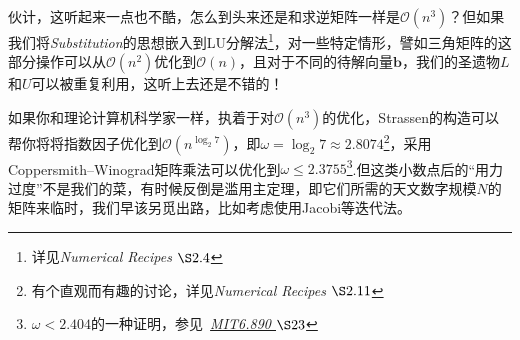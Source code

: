 伙计，这听起来一点也不酷，怎么到头来还是和求逆矩阵一样是$\mathcal{O}(n^3)$？但如果我们将\textit{Substitution}的思想嵌入到LU分解法\footnote{详见\textit{Numerical Recipes $\S 2.4$}}，对一些特定情形，譬如三角矩阵的这部分操作可以从$\mathcal{O}(n^2)$优化到$\mathcal{O}(n)$，且对于不同的待解向量$\bm{b}$，我们的圣遗物$L$和$U$可以被重复利用，这听上去还是不错的！

如果你和理论计算机科学家一样，执着于对$\mathcal{O}(n^3)$的优化，Strassen的构造可以帮你将将指数因子优化到$\mathcal{O}(n^{\log_2 7})$，即$\omega  = \log_2 7 \approx 2.8074$\footnote{有个直观而有趣的讨论，详见\textit{Numerical Recipes $\S 2.11$}}，采用Coppersmith–Winograd矩阵乘法可以优化到$\omega \le 2.3755$\footnote{$\omega < 2.404$的一种证明，参见\ \href{https://people.csail.mit.edu/virgi/6.890/lecture23.pdf}{\textit{MIT6.890 $\S 23$}}}.但这类小数点后的“用力过度”不是我们的菜，有时候反倒是滥用主定理，即它们所需的天文数字规模$N$的矩阵来临时，我们早该另觅出路，比如考虑使用Jacobi等迭代法。